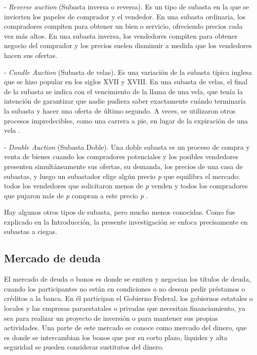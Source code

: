     - \textit{Reverse auction} (Subasta inversa o reversa).
    Es un tipo de subasta en la que se invierten los papeles de comprador y el vendedor. En una subasta ordinaria, los compradores compiten 
    para obtener un bien o servicio, ofreciendo precios cada vez más altos. En una subasta inversa, los vendedores compiten para obtener 
    negocio del comprador y los precios suelen disminuir a medida que los vendedores hacen sus ofertas.

    - \textit{Candle Auction} (Subasta de velas).
    Es una variación de la subasta típica inglesa que se hizo popular en los siglos XVII y XVIII. En una subasta de velas, el final 
    de la subasta se indica con el vencimiento de la llama de una vela, que tenía la intención de garantizar que nadie pudiera saber 
    exactamente cuándo terminaría la subasta y hacer una oferta de último segundo. A veces, se utilizaron otros procesos impredecibles, 
    como una carrera a pie, en lugar de la expiración de una vela \parencite{patten1970}.

    - \textit{Double Auction} (Subasta Doble).
    Una doble subasta es un proceso de compra y venta de bienes cuando los compradores potenciales y los posibles vendedores presenten 
    simultáneamente sus ofertas, su demanda, los precios de una casa de subastas, y luego un subastador elige algún precio \textit{p} que 
    equilibra el mercado: todos los vendedores que solicitaron menos de \textit{p} venden y todos los compradores que pujaron más de 
    \textit{p} compran a este precio \textit{p} \parencite{friedman1992}.
    
    Hay algunos otros tipos de subasta, pero mucho menos conocidas. Como fue explicado en la Introducción, la presente investigación se 
    enfoca precisamente en subastas a ciegas.

  \subsection{Mercado de deuda} \hspace*{}

    El mercado de deuda o bonos es donde se emiten y negocian los títulos de deuda, cuando los participantes no están en condiciones o no 
    desean pedir préstamos o créditos a la banca. En él participan el Gobierno Federal, los gobiernos estatales o locales y las empresas 
    paraestatales o privadas que necesitan financiamiento, ya sea para realizar un proyecto de inversión o para mantener sus propias 
    actividades. Una parte de este mercado se conoce como mercado del dinero, que es donde se intercambian los bonos que por su corto 
    plazo, liquidez y alta seguridad se pueden considerar sustitutos del dinero.

